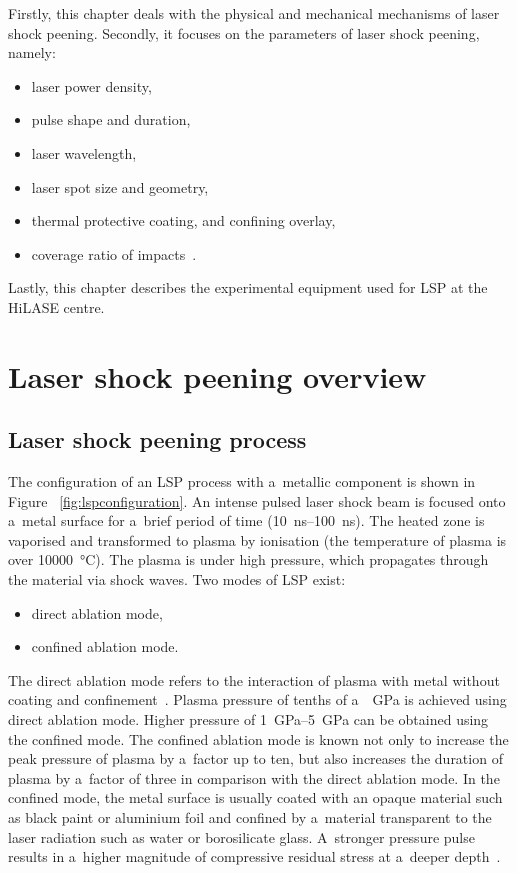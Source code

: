 Firstly, this chapter deals with the physical and mechanical mechanisms of laser shock peening. Secondly, it focuses on the parameters of laser shock peening, namely:

\begin{itemize}
    
    \item laser power density,
    \item pulse shape and duration,
    \item laser wavelength,
    \item laser spot size and geometry,
    \item thermal protective coating, and confining overlay,
    \item coverage ratio of impacts~\cite{dane_2000}.

\end{itemize}
Lastly, this chapter describes the experimental equipment used for LSP at the HiLASE centre. 


\section{Laser shock peening overview}

\subsection{Laser shock peening process}
The configuration of an LSP process with a~metallic component is shown in Figure~ \ref{fig:lspconfiguration}. An intense pulsed laser shock beam is focused onto a~metal surface for a~brief period of time (\SIrange{10}{100}{\ns}). The heated zone is vaporised and transformed to plasma by ionisation (the temperature of plasma is over \SI{10000}{\degreeCelsius}). The plasma is under high pressure, which propagates through the material via shock waves. Two modes of LSP exist: 

\begin{itemize}

    \item direct ablation mode,
    \item confined ablation mode.

\end{itemize}

The direct ablation mode refers to the interaction of plasma with metal without coating and confinement~\cite{sano}. Plasma pressure of tenths of a~\SI{}{\GPa} is achieved using direct ablation mode. Higher pressure of \SIrange{1}{5}{\GPa} can be obtained using the confined mode. The confined ablation mode is known not only to increase the peak pressure of plasma by a~factor up to ten, but also increases the duration of plasma by a~factor of three in comparison with the direct ablation mode. In the confined mode, the metal surface is usually coated with an opaque material such as black paint or aluminium foil and confined by a~material transparent to the laser radiation such as water or borosilicate glass. A~stronger pressure pulse results in a~higher magnitude of compressive residual stress at a~deeper depth~\cite{fairland}. 

